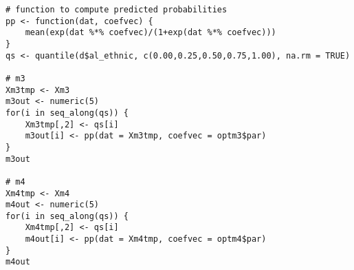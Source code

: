 \documentclass[a4paper,12pt]{article}
\begin{document}
\begin{enumerate}
\begin{solution}
\begin{lstlisting}
# function to compute predicted probabilities
pp <- function(dat, coefvec) {
    mean(exp(dat %*% coefvec)/(1+exp(dat %*% coefvec)))
}
qs <- quantile(d$al_ethnic, c(0.00,0.25,0.50,0.75,1.00), na.rm = TRUE)

# m3
Xm3tmp <- Xm3
m3out <- numeric(5)
for(i in seq_along(qs)) {
    Xm3tmp[,2] <- qs[i]
    m3out[i] <- pp(dat = Xm3tmp, coefvec = optm3$par)
}
m3out

# m4
Xm4tmp <- Xm4
m4out <- numeric(5)
for(i in seq_along(qs)) {
    Xm4tmp[,2] <- qs[i]
    m4out[i] <- pp(dat = Xm4tmp, coefvec = optm4$par)
}
m4out
\end{lstlisting}
\end{solution}


\end{enumerate}
\end{document}
